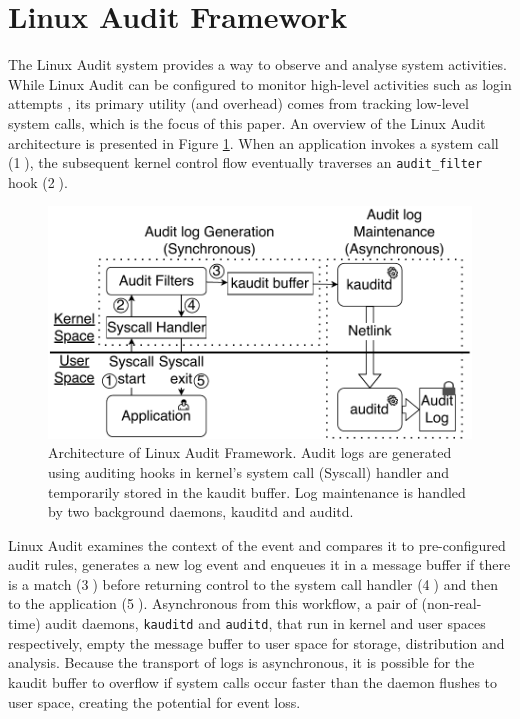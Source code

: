 \section{Linux Audit Framework}
\label{sec:audit}



  The Linux Audit system \cite{suse2004} provides a way to observe and analyse system activities. 
  While Linux Audit can be configured to monitor high-level activities such as login attempts \cite{audit}, its primary utility (and overhead) comes from tracking low-level system calls, which is the focus of this paper.
  An overview of the Linux Audit architecture is presented in Figure \ref{fig:audit_arch}. 
  When an application invokes a system call (\textcircled{1}),
    the subsequent kernel control flow eventually traverses an {\tt audit\_filter} hook (\textcircled{2}).
    \begin{figure}[t!] 
        \centering
        \includegraphics[width=\linewidth]{fig/audit_arch_2.pdf}  
        \caption{\label{fig:audit_arch} Architecture of Linux Audit Framework. Audit logs are generated using auditing hooks in kernel's system call (Syscall) handler and temporarily stored in the kaudit buffer. Log maintenance is handled by two background daemons, kauditd and auditd.}
      \end{figure} 
  Linux Audit examines the context of the event and compares it to pre-configured audit rules,
    generates a new log event and enqueues it in a message buffer if there is a match (\textcircled{3})
    before returning control to the system call handler (\textcircled{4}) and then to the application (\textcircled{5}).
  Asynchronous from this workflow, a pair of (non-real-time) audit daemons, {\tt kauditd} and {\tt auditd}, that run in kernel and user spaces respectively,
    empty the message buffer to user space for storage, distribution and analysis.
  Because the transport of logs is asynchronous, it is possible for the kaudit buffer to overflow if
    system calls occur faster than the daemon flushes to user space,
    creating the potential for event loss.  